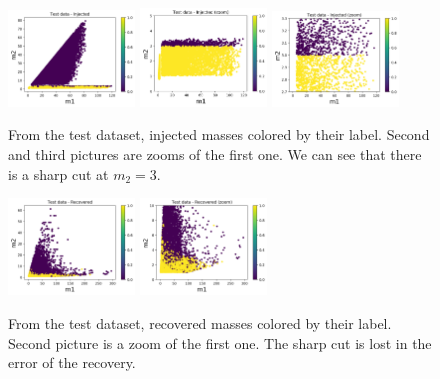 \documentclass[prd,aps,twocolumn,a4paper,showkeys,nofootinbib]{revtex4-2}
\begin{document}
\begin{figure}[]
  \center
  \includegraphics[width=0.3\textwidth]{./FigNS/label_injected}
  \includegraphics[width=0.3\textwidth]{./FigNS/label_injected_1}
  \includegraphics[width=0.3\textwidth]{./FigNS/label_injected_2}
  \caption{\label{fig:label_injected} From the test dataset, injected masses colored by their label. Second and third pictures are zooms of the first one. We can see that there is a sharp cut at $m_2=3$.}
\end{figure}

\begin{figure}[]
  \center
  \includegraphics[width=0.3\textwidth]{./FigNS/label_recovered}
  \includegraphics[width=0.3\textwidth]{./FigNS/label_recovered_1}
  \caption{\label{fig:label_recovered} From the test dataset, recovered masses colored by their label. Second picture is a zoom of the first one. The sharp cut is lost in the error of the recovery.}
\end{figure}
\end{document}
